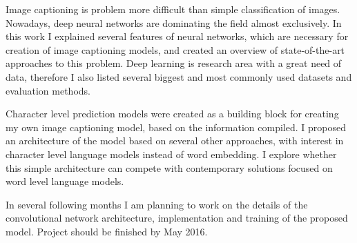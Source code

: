 
Image captioning is problem more difficult than simple classification of images. Nowadays, deep neural networks are dominating the field almost exclusively. In this work I explained several features of neural networks, which are necessary for creation of image captioning models, and created an overview of state-of-the-art approaches to this problem. Deep learning is research area with a great need of data, therefore I also listed several biggest and most commonly used datasets and evaluation methods.

Character level prediction models were created as a building block for creating my own image captioning model, based on the information compiled. I proposed an architecture of the model based on several other approaches, with interest in character level language models instead of word embedding. I explore whether this simple architecture can compete with contemporary solutions focused on word level language models.

In several following months I am planning to work on the details of the convolutional network architecture, implementation and training of the proposed model. Project should be finished by May 2016.


